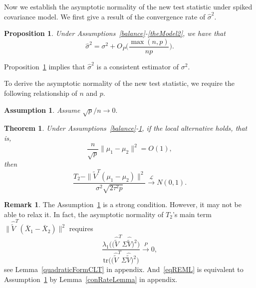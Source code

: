 \documentclass[review]{elsarticle}
\theoremstyle{plain}
\newtheorem{theorem}{\quad\quad Theorem}
\newtheorem{proposition}{\quad\quad Proposition}
\newtheorem{assumption}{\quad\quad Assumption}
\theoremstyle{definition}
\newtheorem{remark}{\quad\quad Remark}
\theoremstyle{remark}
\begin{document}
Now we establish the asymptotic normality of the new test statistic under spiked covariance model.
We first give a result of the convergence rate of $\hat{\sigma}^2$.
\begin{proposition}\label{varianceEstimation}
    Under Assumptions~\ref{balance}-\ref{theModel2}, we have that%
    $$
    \hat{\sigma}^2=\sigma^2 + O_P\Big(\frac{\max (n,p)}{np}\Big).
    $$
\end{proposition}
Proposition~\ref{varianceEstimation} implies that $\hat{\sigma}^2$ is a consistent estimator of $\sigma^2$.   

To derive the asymptotic normality of the new test statistic, we require the following relationship of $n$ and $p$.
\begin{assumption}\label{pAndN}
    Assume
    $
    {\sqrt{p}}/{n}\to 0.
    $
\end{assumption}

 


\begin{theorem}\label{myPanpan}
    Under Assumptions~\ref{balance}-\ref{pAndN},
if the local alternative holds, that is,
    $$\frac{n}{\sqrt{p}}\|\mu_1-\mu_2\|^2=O(1),$$
then 
\begin{equation*}
        \frac{T_2-\|\tilde{V}^T(\mu_1-\mu_2)\|^2}{\sigma^2\sqrt{2\tau^2 p}}\xrightarrow{\mathcal{L}}N(0,1).
\end{equation*}
\end{theorem} 
\begin{remark}
The Assumption~\ref{pAndN} is a strong condition.
However, it may not be able to relax it. In fact, the asymptotic normality of $T_2$'s main term $\|\hat{\tilde{V}}^T(\bar{X}_1-\bar{X}_2)\|^2$ requires 
\begin{equation}\label{eqREML}
    \frac{\lambda_1\big(\big(\hat{\tilde{V}}^T \Sigma \hat{\tilde{V}}\big)^2\big)}{\mathrm{tr}\big(\big(\hat{\tilde{V}}^T \Sigma \hat{\tilde{V}}\big)^2\big)
}\xrightarrow{P} 0,
\end{equation}
see Lemma~\ref{quadraticFormCLT} in appendix. And~\eqref{eqREML} is equivalent to Assumption~\ref{pAndN} by Lemma~\ref{conRateLemma} in appendix.
\end{remark}




\end{document}
